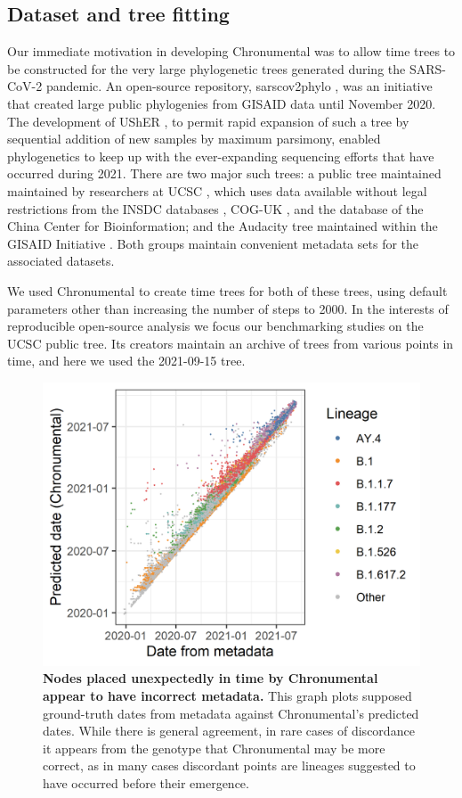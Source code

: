 \subsection*{Dataset and tree fitting}

Our immediate motivation in developing Chronumental was to allow time trees to be constructed for the very large phylogenetic trees generated during the SARS-CoV-2 pandemic. An open-source repository, sarscov2phylo \citep{phylo}, was an initiative that created large public phylogenies from GISAID data until November 2020. The development of UShER \citep{Turakhia2021-la}, to permit rapid expansion of such a tree by sequential addition of new samples by maximum parsimony, enabled phylogenetics to keep up with the ever-expanding sequencing efforts that have occurred during 2021. There are two major such trees: a public tree maintained maintained by researchers at UCSC \citep{McBroome2021-fn}, which uses data available without legal restrictions from the INSDC databases \citep{Arita2021-dc}, COG-UK \citep{Nicholls2021-fz}, and the database of the China Center for Bioinformation; and the Audacity tree maintained within the GISAID Initiative \citep{gisaid}. Both groups maintain convenient metadata sets for the associated datasets.

We used Chronumental to create time trees for both of these trees, using default parameters other than increasing the number of steps to 2000. In the interests of reproducible open-source analysis we focus our benchmarking studies on the UCSC public tree. Its creators maintain an archive of trees from various points in time, and here we used the 2021-09-15 tree.

\begin{figure}[t]
\centering
\includegraphics[width=1\linewidth]{Figures/anac.png}
\caption{\textbf{Nodes placed unexpectedly in time by Chronumental appear to have incorrect metadata.} This graph plots supposed ground-truth dates from metadata against Chronumental's predicted dates. While there is general agreement, in rare cases of discordance it appears from the genotype that Chronumental may be more correct, as in many cases discordant points are lineages suggested to have occurred before their emergence.
}
\label{anac}
\end{figure}


